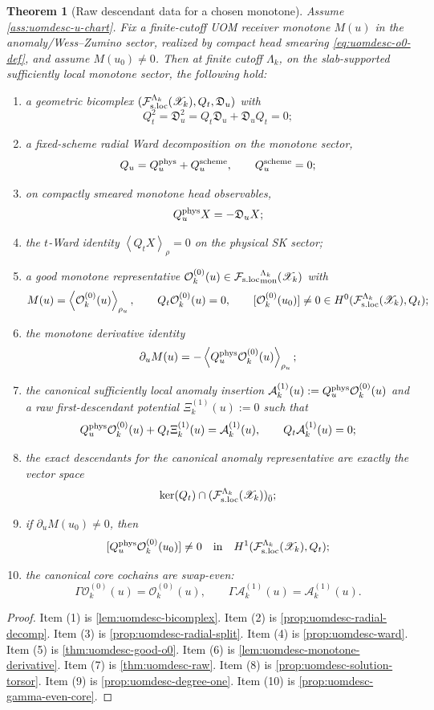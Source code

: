 \documentclass[11pt]{article}
\theoremstyle{definition}
\theoremstyle{plain}
\newtheorem{theorem}[definition]{Theorem}
\theoremstyle{remark}
\newcommand{\Fsloc}{\mathcal F_{\rm s.loc}}
\newcommand{\Xscr}{\mathscr X}
\newcommand{\Ozero}{\mathcal O^{(0)}}
\newcommand{\Aone}{\mathcal A^{(1)}}
\newcommand{\Xione}{\Xi^{(1)}}
\newcommand{\Qt}{Q_t}
\newcommand{\Qu}{Q_u}
\newcommand{\Du}{\mathfrak D_u}
\newcommand{\Quphys}{Q_u^{\rm phys}}
\newcommand{\Quscheme}{Q_u^{\rm scheme}}
\newcommand{\pair}[1]{\left\langle #1 \right\rangle}
\begin{document}
\begin{theorem}[Raw descendant data for a chosen monotone]
\label{thm:uomdesc-raw-package}
Assume \cref{ass:uomdesc-u-chart}.
Fix a finite-cutoff UOM receiver monotone \(M(u)\) in the anomaly/Wess--Zumino sector, realized by
compact head smearing \eqref{eq:uomdesc-o0-def}, and assume \(M(u_0)\neq 0\).
Then at finite cutoff \(\Lambda_k\), on the slab-supported sufficiently local monotone sector,
the following hold:
\begin{enumerate}[leftmargin=2em]
\item a geometric bicomplex \((\Fsloc^{\Lambda_k}(\Xscr_k),\Qt,\Du)\) with
  \[
  \Qt^2=\Du^2=\Qt\Du+\Du\Qt=0;
  \]
\item a fixed-scheme radial Ward decomposition on the monotone sector,
  \[
  \Qu=\Quphys+\Quscheme,
  \qquad
  \Quscheme=0;
  \]
\item on compactly smeared monotone head observables,
  \[
  \Quphys X=-\Du X;
  \]
\item the \(t\)-Ward identity \(\pair{\Qt X}_\rho=0\) on the physical SK sector;
\item a good monotone representative \(\Ozero_k(u)\in{\Fsloc}_{\rm mon}^{\Lambda_k}(\Xscr_k)\) with
  \[
  M(u)=\pair{\Ozero_k(u)}_{\rho_u},
  \qquad
  \Qt\Ozero_k(u)=0,
  \qquad
  [\Ozero_k(u_0)]\neq 0\in H^0(\Fsloc^{\Lambda_k}(\Xscr_k),\Qt);
  \]
\item the monotone derivative identity
  \[
  \partial_u M(u)=-\pair{\Quphys\Ozero_k(u)}_{\rho_u};
  \]
\item the canonical sufficiently local anomaly insertion
  \(\Aone_k(u):=\Quphys\Ozero_k(u)\) and a raw first-descendant potential
  \(\Xione_k(u):=0\) such that
  \[
  \Quphys\Ozero_k(u)+\Qt\Xione_k(u)=\Aone_k(u),
  \qquad
  \Qt\Aone_k(u)=0;
  \]
\item the exact descendants for the canonical anomaly representative are exactly the vector space
  \[
  \ker(\Qt)\cap(\Fsloc^{\Lambda_k}(\Xscr_k))_{\bar 0};
  \]
\item if \(\partial_u M(u_0)\neq 0\), then
  \[
  [\Quphys\Ozero_k(u_0)]\neq 0
  \quad\text{in}\quad
  H^1(\Fsloc^{\Lambda_k}(\Xscr_k),\Qt);
  \]
\item the canonical core cochains are swap-even:
  \[
  \Gamma\Ozero_k(u)=\Ozero_k(u),
  \qquad
  \Gamma\Aone_k(u)=\Aone_k(u).
  \]
\end{enumerate}
\end{theorem}

\begin{proof}
Item (1) is \cref{lem:uomdesc-bicomplex}.
Item (2) is \cref{prop:uomdesc-radial-decomp}.
Item (3) is \cref{prop:uomdesc-radial-split}.
Item (4) is \cref{prop:uomdesc-ward}.
Item (5) is \cref{thm:uomdesc-good-o0}.
Item (6) is \cref{lem:uomdesc-monotone-derivative}.
Item (7) is \cref{thm:uomdesc-raw}.
Item (8) is \cref{prop:uomdesc-solution-torsor}.
Item (9) is \cref{prop:uomdesc-degree-one}.
Item (10) is \cref{prop:uomdesc-gamma-even-core}.
\end{proof}
\end{document}
